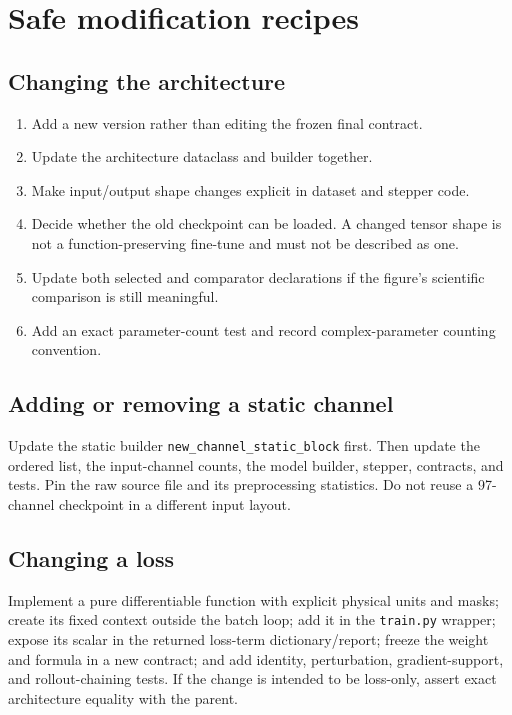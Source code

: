 \documentclass[11pt,oneside]{report}
\newcommand{\repo}[1]{\nolinkurl{#1}}
\newcommand{\code}[1]{\texttt{\detokenize{#1}}}
\begin{document}
\section{Safe modification recipes}

\subsection{Changing the architecture}

\begin{enumerate}
  \item Add a new version rather than editing the frozen final contract.
  \item Update the architecture dataclass and builder together.
  \item Make input/output shape changes explicit in dataset and stepper code.
  \item Decide whether the old checkpoint can be loaded. A changed tensor
        shape is not a function-preserving fine-tune and must not be described
        as one.
  \item Update both selected and comparator declarations if the figure's
        scientific comparison is still meaningful.
  \item Add an exact parameter-count test and record complex-parameter counting
        convention.
\end{enumerate}

\subsection{Adding or removing a static channel}

Update the static builder \repo{new_channel_static_block} first. Then update the
ordered \code{static_channels} list, the input-channel counts, the model
builder, stepper, contracts, and tests. Pin the raw source file and its
preprocessing statistics. Do not reuse a 97-channel checkpoint in a different
input layout.

\subsection{Changing a loss}

Implement a pure differentiable function with explicit physical units and
masks; create its fixed context outside the batch loop; add it in the
\repo{train.py} wrapper; expose its scalar in the returned loss-term
dictionary/report; freeze the weight and formula in a new contract; and add
identity, perturbation, gradient-support, and rollout-chaining tests. If the
change is intended to be loss-only, assert exact architecture equality with
the parent.
\end{document}
